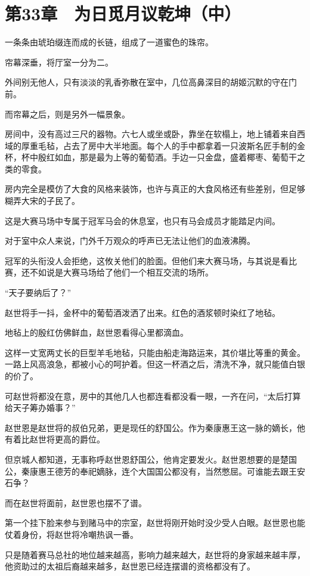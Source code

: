\section{第33章　为日觅月议乾坤（中）}

一条条由琥珀缀连而成的长链，组成了一道蜜色的珠帘。

帘幕深垂，将厅室一分为二。

外间别无他人，只有淡淡的乳香弥散在室中，几位高鼻深目的胡姬沉默的守在门前。

而帘幕之后，则是另外一幅景象。

房间中，没有高过三尺的器物。六七人或坐或卧，靠坐在软榻上，地上铺着来自西域的厚重毛毡，占去了房中大半地面。每个人的手中都拿着一只波斯名匠手制的金杯，杯中殷红如血，那是最为上等的葡萄酒。手边一只金盘，盛着椰枣、葡萄干之类的零食。

房内完全是模仿了大食的风格来装饰，也许与真正的大食风格还有些差别，但足够糊弄大宋的子民了。

这是大赛马场中专属于冠军马会的休息室，也只有马会成员才能踏足内间。

对于室中众人来说，门外千万观众的呼声已无法让他们的血液沸腾。

冠军的头衔没人会拒绝，这攸关他们的脸面。但他们来大赛马场，与其说是看比赛，还不如说是大赛马场给了他们一个相互交流的场所。

“天子要纳后了？”

赵世将手一抖，金杯中的葡萄酒泼洒了出来。红色的酒浆顿时染红了地毡。

地毡上的殷红仿佛鲜血，赵世恩看得心里都滴血。

这样一丈宽两丈长的巨型羊毛地毡，只能由船走海路运来，其价堪比等重的黄金。一路上风高浪急，都被小心的呵护着。但这一杯酒之后，清洗不净，就只能值白银的价了。

可赵世将都没在意，房中的其他几人也都连看都没看一眼，一齐在问，“太后打算给天子筹办婚事？”

赵世恩是赵世将的叔伯兄弟，更是现任的舒国公。作为秦康惠王这一脉的嫡长，他有着比赵世将更高的爵位。

但京城人都知道，无事称呼赵世恩舒国公，他肯定要发火。赵世恩想要的是楚国公，秦康惠王德芳的奉祀嫡脉，连个大国国公都没有，当然憋屈。可谁能去跟王安石争？

而在赵世将面前，赵世恩也摆不了谱。

第一个挂下脸来参与到赌马中的宗室，赵世将刚开始时没少受人白眼。赵世恩也能仗着身份，将赵世将冷嘲热讽一番。

只是随着赛马总社的地位越来越高，影响力越来越大，赵世将的身家越来越丰厚，他资助过的太祖后裔越来越多，赵世恩已经连摆谱的资格都没有了。

